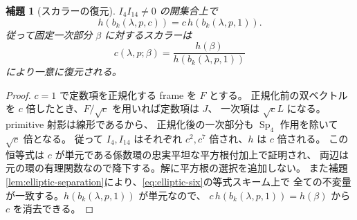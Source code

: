 \documentclass[11pt,a4paper]{ltjsarticle}
\DeclareMathOperator{\Sp}{Sp}
\newtheorem{lemma}[theorem]{補題}
\theoremstyle{remark}
\begin{document}
\begin{lemma}[スカラーの復元]\label{lem:elliptic-scalar}
$I_4I_{14}\ne0$ の開集合上で
\[
 h(b_k(\lambda,p,c))=c\,h(b_k(\lambda,p,1)).
\]
従って固定一次部分 $\beta$ に対するスカラーは
\begin{equation}\label{eq:elliptic-recovered-c}
 c(\lambda,p;\beta)=\frac{h(\beta)}{h(b_k(\lambda,p,1))}
\end{equation}
により一意に復元される。
\end{lemma}
\begin{proof}
$c=1$ で定数項を正規化する frame を $F$ とする。
正規化前の双ベクトルを $c$ 倍したとき、$F/\sqrt c$ を用いれば定数項は $J$、
一次項は $\sqrt cL$ になる。primitive 射影は線形であるから、
正規化後の一次部分も $\Sp_4$ 作用を除いて $\sqrt c$ 倍となる。
従って $I_4,I_{14}$ はそれぞれ $c^2,c^7$ 倍され、$h$ は $c$ 倍される。
この恒等式は $c$ が単元である係数環の忠実平坦な平方根付加上で証明され、
両辺は元の環の有理関数なので降下する。解に平方根の選択を追加しない。
また補題\ref{lem:elliptic-separation}により、\eqref{eq:elliptic-six}の等式スキーム上で
全ての不変量が一致する。$h(b_k(\lambda,p,1))$ が単元なので、
$c\,h(b_k(\lambda,p,1))=h(\beta)$ から $c$ を消去できる。
\end{proof}
\end{document}
